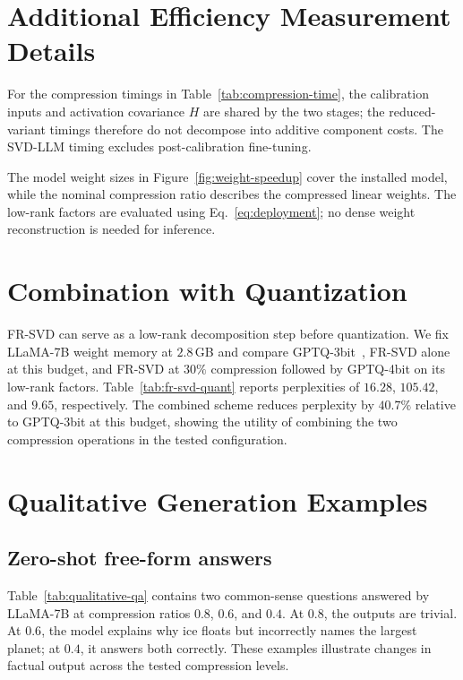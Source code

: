 \section{Additional Efficiency Measurement Details}\label{app:efficiency}

For the compression timings in Table~\ref{tab:compression-time}, the calibration inputs and activation covariance $H$ are shared by the two stages; the reduced-variant timings therefore do not decompose into additive component costs. The SVD-LLM timing excludes post-calibration fine-tuning.

The model weight sizes in Figure~\ref{fig:weight-speedup} cover the installed model, while the nominal compression ratio describes the compressed linear weights. The low-rank factors are evaluated using Eq.~\eqref{eq:deployment}; no dense weight reconstruction is needed for inference.

\section{Combination with Quantization}\label{app:quantization}
FR-SVD can serve as a low-rank decomposition step before quantization. We fix LLaMA-7B weight memory at $2.8$\,GB and compare GPTQ-3bit~\citep{frantar2023gptq}, FR-SVD alone at this budget, and FR-SVD at $30\%$ compression followed by GPTQ-4bit on its low-rank factors. Table~\ref{tab:fr-svd-quant} reports perplexities of $16.28$, $105.42$, and $9.65$, respectively. The combined scheme reduces perplexity by $40.7\%$ relative to GPTQ-3bit at this budget, showing the utility of combining the two compression operations in the tested configuration.



\section{Qualitative Generation Examples}\label{app:qualitative}

\subsection{Zero-shot free-form answers}
Table~\ref{tab:qualitative-qa} contains two common-sense questions answered by LLaMA-7B at compression ratios $0.8$, $0.6$, and $0.4$. At $0.8$, the outputs are trivial. At $0.6$, the model explains why ice floats but incorrectly names the largest planet; at $0.4$, it answers both correctly. These examples illustrate changes in factual output across the tested compression levels.

